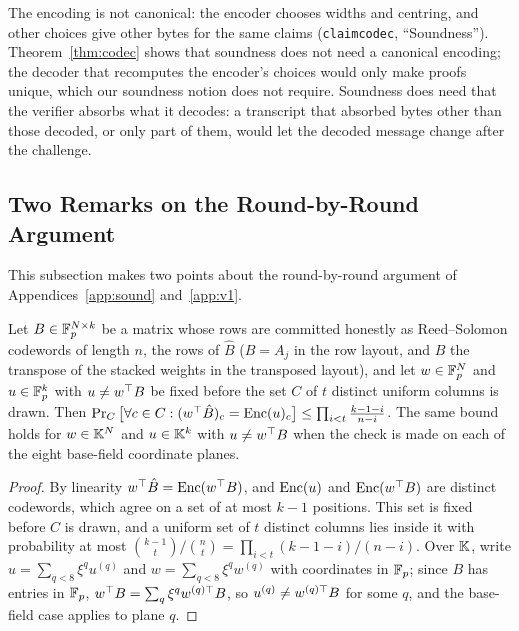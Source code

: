 \noindent The encoding is not canonical: the encoder chooses widths and centring, and other choices
give other bytes for the same claims (\texttt{claimcodec}, ``Soundness''). Theorem~\ref{thm:codec}
shows that soundness does not need a canonical encoding; the decoder that recomputes the encoder's
choices would only make proofs unique, which our soundness notion does not require. Soundness does need that the
verifier absorbs what it decodes: a transcript that absorbed bytes other than those decoded, or only
part of them, would let the decoded message change after the challenge.

\subsection{Two Remarks on the Round-by-Round Argument}
\label{app:rbr}

This subsection makes two points about the round-by-round argument of
Appendices~\ref{app:sound} and~\ref{app:v1}.

\begin{lemma}
\label{lem:col-any}
Let $B\in\mathbb{F}_p^{N\times k}$ be a matrix whose rows are committed honestly as Reed--Solomon codewords
of length $n$, the rows of $\hat B$ ($B=A_j$ in the row layout, and $B$ the transpose of the stacked
weights in the transposed layout), and let $w\in\mathbb{F}_p^N$ and $u\in\mathbb{F}_p^k$ with $u\neq w^\top B$ be fixed
before the set $C$ of $t$ distinct uniform columns is drawn. Then
$\Pr_C\big[\forall c\in C:(w^\top\hat B)_c=\mathrm{Enc}(u)_c\big]\le\prod_{i<t}\frac{k-1-i}{n-i}$. The same
bound holds for $w\in\mathbb{K}^N$ and $u\in\mathbb{K}^k$ with $u\neq w^\top B$ when the check is made on each
of the eight base-field coordinate planes.
\end{lemma}

\begin{proof}
By linearity $w^\top\hat B=\mathrm{Enc}(w^\top B)$, and $\mathrm{Enc}(u)$ and $\mathrm{Enc}(w^\top B)$ are distinct codewords,
which agree on a set of at most $k-1$ positions. This set is fixed before $C$ is drawn, and a
uniform set of $t$ distinct columns lies inside it with probability at most
$\binom{k-1}{t}/\binom{n}{t}=\prod_{i<t}(k-1-i)/(n-i)$. Over $\mathbb{K}$, write
$u=\sum_{q<8}\xi^qu^{(q)}$ and $w=\sum_{q<8}\xi^qw^{(q)}$ with coordinates in $\mathbb{F}_p$; since $B$ has
entries in $\mathbb{F}_p$, $w^\top B=\sum_q\xi^qw^{(q)\top}B$, so $u^{(q)}\neq w^{(q)\top}B$ for some $q$, and the
base-field case applies to plane $q$.
\end{proof}

